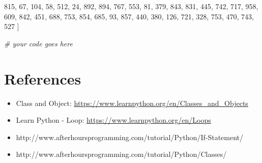 \documentclass[11pt]{article}
\providecommand{\tightlist}{%
      \setlength{\itemsep}{0pt}\setlength{\parskip}{0pt}}
\newenvironment{Shaded}{}{}
\newcommand{\DecValTok}[1]{\textcolor[rgb]{0.25,0.63,0.44}{{#1}}}
\newcommand{\CommentTok}[1]{\textcolor[rgb]{0.38,0.63,0.69}{\textit{{#1}}}}
\newcommand{\NormalTok}[1]{{#1}}
\begin{document}
\begin{Shaded}
\begin{Highlighting}[]
    \DecValTok{815}\NormalTok{, }\DecValTok{67}\NormalTok{, }\DecValTok{104}\NormalTok{, }\DecValTok{58}\NormalTok{, }\DecValTok{512}\NormalTok{, }\DecValTok{24}\NormalTok{, }\DecValTok{892}\NormalTok{, }\DecValTok{894}\NormalTok{, }\DecValTok{767}\NormalTok{, }\DecValTok{553}\NormalTok{, }\DecValTok{81}\NormalTok{, }\DecValTok{379}\NormalTok{, }\DecValTok{843}\NormalTok{, }\DecValTok{831}\NormalTok{, }\DecValTok{445}\NormalTok{, }\DecValTok{742}\NormalTok{, }\DecValTok{717}\NormalTok{,}
    \DecValTok{958}\NormalTok{, }\DecValTok{609}\NormalTok{, }\DecValTok{842}\NormalTok{, }\DecValTok{451}\NormalTok{, }\DecValTok{688}\NormalTok{, }\DecValTok{753}\NormalTok{, }\DecValTok{854}\NormalTok{, }\DecValTok{685}\NormalTok{, }\DecValTok{93}\NormalTok{, }\DecValTok{857}\NormalTok{, }\DecValTok{440}\NormalTok{, }\DecValTok{380}\NormalTok{, }\DecValTok{126}\NormalTok{, }\DecValTok{721}\NormalTok{, }\DecValTok{328}\NormalTok{, }\DecValTok{753}\NormalTok{, }\DecValTok{470}\NormalTok{,}
    \DecValTok{743}\NormalTok{, }\DecValTok{527}
\NormalTok{]}

\CommentTok{# your code goes here}
\end{Highlighting}
\end{Shaded}

    \section{References}\label{references}

\begin{itemize}
\tightlist
\item
  Class and Object:
  \url{https://www.learnpython.org/en/Classes_and_Objects}
\item
  Learn Python - Loop: \url{https://www.learnpython.org/en/Loops}
\item
  http://www.afterhoursprogramming.com/tutorial/Python/If-Statement/
\item
  http://www.afterhoursprogramming.com/tutorial/Python/Classes/
\end{itemize}


    
    
    
    
\end{document}

